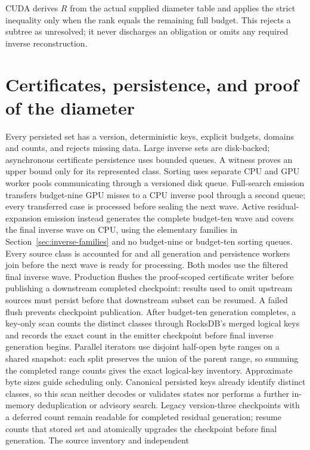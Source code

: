 \documentclass[11pt,a4paper]{article}
\begin{document}
CUDA derives $R$ from the actual supplied diameter table and applies the
strict inequality only when the rank equals the remaining full budget.
This rejects a subtree as unresolved; it never discharges an obligation or
omits any required inverse reconstruction.

\section{Certificates, persistence, and proof of the diameter}
Every persisted set has a version, deterministic keys, explicit budgets,
domains and counts, and rejects missing data. Large inverse sets are disk-backed;
asynchronous certificate persistence uses bounded queues. A witness proves an
upper bound only for its represented class. Sorting uses separate CPU and
GPU worker pools communicating through a versioned disk queue. Full-search
emission transfers budget-nine GPU misses to a CPU inverse pool through a
second queue; every transferred case is processed before sealing the next wave. Active
residual-expansion emission instead generates the complete budget-ten wave
and covers the final inverse wave on CPU, using the elementary families in
Section~\ref{sec:inverse-families} and no budget-nine or budget-ten sorting queues. Every source
class is accounted for and all generation and persistence workers join before
the next wave is ready for processing. Both modes use the filtered final
inverse wave. Production flushes the proof-scoped certificate writer before
publishing a downstream completed checkpoint: results used to omit upstream
sources must persist before that downstream subset can be resumed. A failed
flush prevents checkpoint publication. After budget-ten generation completes,
a key-only scan counts the distinct classes through RocksDB's merged
logical keys and records the exact count in the emitter checkpoint
before final inverse generation begins. Parallel iterators use disjoint
half-open byte ranges on a shared snapshot: each split preserves the union
of the parent range, so summing the completed range counts gives the exact
logical-key inventory. Approximate byte sizes guide scheduling only.
Canonical persisted keys already
identify distinct classes, so this scan neither decodes or validates states
nor performs a further in-memory deduplication or advisory search. Legacy
version-three checkpoints with a deferred count remain readable for completed
residual generation; resume counts that stored set and atomically upgrades
the checkpoint before final generation. The source inventory and independent
\end{document}
